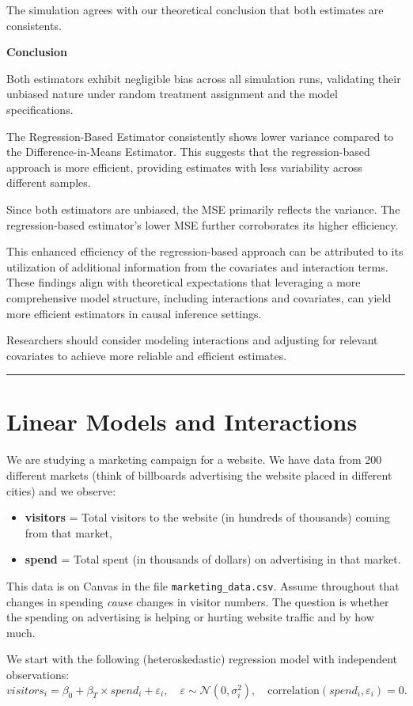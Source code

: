 \documentclass{article}
\newenvironment{colorparagraph}[1]{\par\color{#1}}{\par}
\begin{document}
The simulation agrees with our theoretical conclusion that both estimates are consistents.

\textbf{Conclusion}

Both estimators exhibit negligible bias across all simulation runs, validating their unbiased nature under random treatment assignment and the model specifications.

The Regression-Based Estimator consistently shows lower variance compared to the Difference-in-Means Estimator. This suggests that the regression-based approach is more efficient, providing estimates with less variability across different samples.

Since both estimators are unbiased, the MSE primarily reflects the variance. The regression-based estimator's lower MSE further corroborates its higher efficiency.

This enhanced efficiency of the regression-based approach can be attributed to its utilization of additional information from the covariates and interaction terms. These findings align with theoretical expectations that leveraging a more comprehensive model structure, including interactions and covariates, can yield more efficient estimators in causal inference settings.

Researchers should consider modeling interactions and adjusting for relevant covariates to achieve more reliable and efficient estimates.

\newpage

\begin{colorparagraph}{questioncolor}
\rule{\textwidth}{0.5pt}
\label{q4}\section{Linear Models and Interactions}

We are studying a marketing campaign for a website. We have data from 200 different markets (think of billboards advertising the website placed in different cities) and we observe:
\begin{itemize}
    \item \textbf{visitors} = Total visitors to the website (in hundreds of thousands) coming from that market,
    \item \textbf{spend} = Total spent (in thousands of dollars) on advertising in that market.
\end{itemize}

This data is on Canvas in the file \texttt{marketing\_data.csv}. Assume throughout that changes in spending \textit{cause} changes in visitor numbers. The question is whether the spending on advertising is helping or hurting website traffic and by how much.

We start with the following (heteroskedastic) regression model with independent observations:
\[
visitors_i = \beta_0 + \beta_T \times spend_i + \varepsilon_i, \quad \varepsilon \sim \mathcal{N}(0, \sigma_i^2), \quad \text{correlation}(spend_i, \varepsilon_i) = 0.
\]
\end{colorparagraph}
\end{document}

